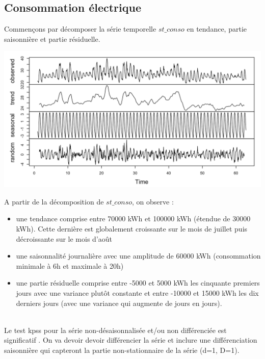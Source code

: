 \documentclass{article}
\theoremstyle{definition}
\theoremstyle{remark}
\begin{document}
\subsection{Consommation électrique}
Commençons par décomposer la série temporelle $st\_conso$ en tendance, partie saisonnière et partie résiduelle.
\FloatBarrier
\begin{minipage}{.5\textwidth}
\hspace{-1cm}
\includegraphics[width=0.95\linewidth]{fig2.png}
    \label{fig:enter-label}
\end{minipage}
\begin{minipage}{.5\textwidth}
    A partir de la décomposition de $st\_conso$, on observe :
    \begin{itemize}
    \item une tendance comprise entre 70000 kWh et 100000 kWh (étendue de 30000 kWh). Cette dernière est globalement croissante sur le mois de juillet puis décroissante sur le mois d’août
    \item une saisonnalité journalière avec une amplitude de 60000 kWh  (consommation minimale à 6h et maximale à 20h)
    \item une partie résiduelle comprise entre -5000 et 5000 kWh les cinquante premiers jours avec une variance plutôt constante et entre -10000 et 15000 kWh les dix derniers jours (avec une variance qui augmente de jours en jours).
    \end{itemize}
\end{minipage}
\newline
\\
Le test kpss pour la série non-désaisonnalisée et/ou non différenciée est significatif . On va devoir devoir différencier la série et inclure une différenciation saisonnière qui capteront la partie non-stationnaire de la série (d=1, D=1).\newline
\end{document}
